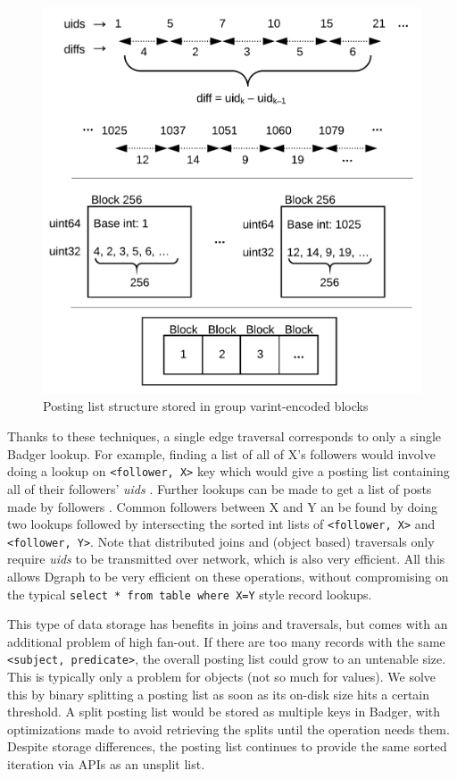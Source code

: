 \documentclass[letterpaper,twocolumn,10pt]{article}
\newcommand{\uids}{\textit{uids} }
\begin{document}
\begin{figure}[t]
\begin{center}
	\includegraphics[scale=0.8]{integerstorage.png}
\end{center}
\caption{Posting list structure stored in group varint-encoded blocks}
\end{figure}

Thanks to these techniques, a single edge traversal corresponds to only a single
Badger lookup. For example, finding a list of all of X's followers would involve
doing a lookup on \texttt{<follower, X>} key which would give a posting list containing
all of their followers' \uids. Further lookups can be made to get a list of posts
made by followers . Common followers between X and Y an be found by doing two
lookups followed by intersecting the sorted int lists of \texttt{<follower, X>} and
\texttt{<follower, Y>}. Note that distributed joins and (object based) traversals only
require \uids to be transmitted over network, which is also very efficient. All
this allows Dgraph to be very efficient on these operations, without
compromising on the typical \texttt{select * from table where X=Y} style record lookups.

This type of data storage has benefits in joins and traversals, but comes with
an additional problem of high fan-out. If there are too many records with the
same \texttt{<subject, predicate>}, the overall posting list could grow to an
untenable size. This is typically only a problem for objects (not so much for
values). We solve this by binary splitting a posting list as soon as its on-disk
size hits a certain threshold. A split posting list would be stored as multiple
keys in Badger, with optimizations made to avoid retrieving the splits until the
operation needs them. Despite storage differences, the posting list continues to
provide the same sorted iteration via APIs as an unsplit list.
\end{document}

